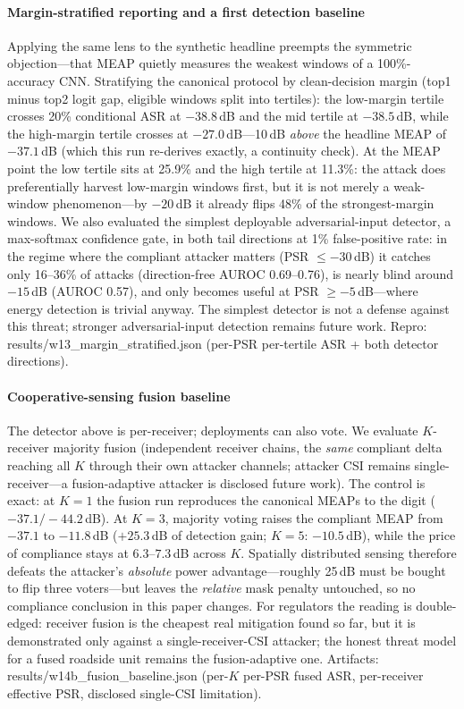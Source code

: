 \documentclass[review]{elsarticle}
\begin{document}
\paragraph{Margin-stratified reporting and a first detection baseline}
Applying the same lens to the synthetic headline preempts the symmetric
objection---that MEAP quietly measures the weakest windows of a
100\%-accuracy CNN. Stratifying the canonical protocol by clean-decision
margin (top1 minus top2 logit gap, eligible windows split into
tertiles): the low-margin tertile crosses 20\% conditional ASR at
$-38.8$\,dB and the mid tertile at $-38.5$\,dB, while the high-margin
tertile crosses at $-27.0$\,dB---10\,dB \emph{above} the headline MEAP
of $-37.1$\,dB (which this run re-derives exactly, a continuity check).
At the MEAP point the low tertile sits at 25.9\% and the high tertile at
11.3\%: the attack does preferentially harvest low-margin windows first,
but it is not merely a weak-window phenomenon---by $-20$\,dB it already
flips 48\% of the strongest-margin windows. We also evaluated the
simplest deployable adversarial-input detector, a max-softmax confidence
gate, in both tail directions at 1\% false-positive rate: in the regime
where the compliant attacker matters (PSR $\le -30$\,dB) it catches only
16--36\% of attacks (direction-free AUROC 0.69--0.76), is nearly blind
around $-15$\,dB (AUROC 0.57), and only becomes useful at PSR $\ge
-5$\,dB---where energy detection is trivial anyway. The simplest
detector is not a defense against this threat; stronger
adversarial-input detection remains future work.
Repro: results/w13\_margin\_stratified.json (per-PSR per-tertile ASR +
both detector directions).

\paragraph{Cooperative-sensing fusion baseline}
\label{par:fusion}
The detector above is per-receiver; deployments can also vote. We
evaluate $K$-receiver majority fusion (independent receiver chains, the
\emph{same} compliant delta reaching all $K$ through their own attacker
channels; attacker CSI remains single-receiver---a fusion-adaptive
attacker is disclosed future work). The control is exact: at $K{=}1$ the
fusion run reproduces the canonical MEAPs to the digit
($-37.1/-44.2$\,dB). At $K{=}3$, majority voting raises the compliant
MEAP from $-37.1$ to $-11.8$\,dB ($+25.3$\,dB of detection gain;
$K{=}5$: $-10.5$\,dB), while the price of compliance stays at
$6.3$--$7.3$\,dB across $K$. Spatially distributed sensing therefore
defeats the attacker's \emph{absolute} power advantage---roughly 25\,dB
must be bought to flip three voters---but leaves the \emph{relative}
mask penalty untouched, so no compliance conclusion in this paper
changes. For regulators the reading is double-edged: receiver fusion is
the cheapest real mitigation found so far, but it is demonstrated only
against a single-receiver-CSI attacker; the honest threat model for a
fused roadside unit remains the fusion-adaptive one. Artifacts:
results/w14b\_fusion\_baseline.json (per-$K$ per-PSR fused ASR,
per-receiver effective PSR, disclosed single-CSI limitation).
\end{document}
